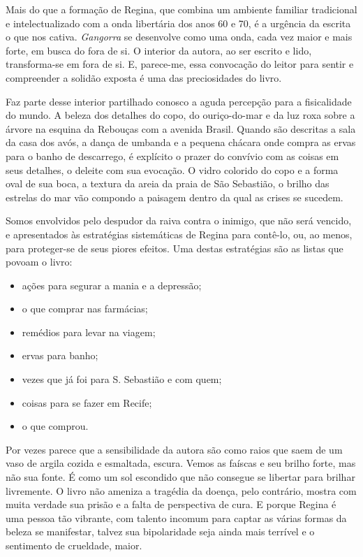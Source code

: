Mais do que a formação de Regina, que combina um ambiente familiar
tradicional e intelectualizado com a onda libertária dos anos 60 e 70, é
a urgência da escrita o que nos cativa. \emph{Gangorra} se desenvolve
como uma onda, cada vez maior e mais forte, em busca do fora de si. O
interior da autora, ao ser escrito e lido, transforma-se em fora de si.
E, parece-me, essa convocação do leitor para sentir e compreender a
solidão exposta é uma das preciosidades do livro.

Faz parte desse interior partilhado conosco a aguda percepção para a
fisicalidade do mundo. A beleza dos detalhes do copo, do ouriço-do-mar e
da luz roxa sobre a árvore na esquina da Rebouças com a avenida Brasil.
Quando são descritas a sala da casa dos avós, a dança de umbanda e a
pequena chácara onde compra as ervas para o banho de descarrego, é
explícito o prazer do convívio com as coisas em seus detalhes, o deleite
com sua evocação. O vidro colorido do copo e a forma oval de sua boca, a
textura da areia da praia de São Sebastião, o brilho das estrelas do mar
vão compondo a paisagem dentro da qual as crises se sucedem.

Somos envolvidos pelo despudor da raiva contra o inimigo, que não será
vencido, e apresentados às estratégias sistemáticas de Regina para
contê-lo, ou, ao menos, para proteger-se de seus piores efeitos. Uma
destas estratégias são as listas que povoam o livro:


\begin{itemize}
\tightlist
\item
  ações para segurar a mania e a depressão;
\item
  o que comprar nas farmácias;
\item
  remédios para levar na viagem;
\item
  ervas para banho;
\item
  vezes que já foi para S. Sebastião e com quem;
\item
  coisas para se fazer em Recife;
\item
  o que comprou.
\end{itemize}

Por vezes parece que a sensibilidade da autora são como raios que saem
de um vaso de argila cozida e esmaltada, escura. Vemos as faíscas e seu
brilho forte, mas não sua fonte. É como um sol escondido que não
consegue se libertar para brilhar livremente. O livro não ameniza a
tragédia da doença, pelo contrário, mostra com muita verdade sua prisão
e a falta de perspectiva de cura. E porque Regina é uma pessoa tão
vibrante, com talento incomum para captar as várias formas da beleza se
manifestar, talvez sua bipolaridade seja ainda mais terrível e o
sentimento de crueldade, maior.

